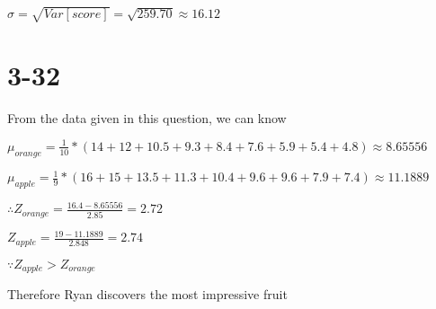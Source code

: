 \documentclass[12pt]{article}
\begin{document}
\begin{spacing}{2.0}
$\sigma=\sqrt{Var[score]}= \sqrt{259.70} \approx 16.12$

\section*{3-32}
From the data given in this question, we can know

$\mu_{orange}=\frac{1}{10}*(14+12+10.5+9.3+8.4+7.6+5.9+5.4+4.8) \approx 8.65556$

$\mu_{apple}=\frac{1}{9}*(16+15+13.5+11.3+10.4+9.6+9.6+7.9+7.4) \approx 11.1889$

$\therefore Z_{orange}=\frac{16.4-8.65556}{2.85}= 2.72$

$Z_{apple}= \frac{19-11.1889}{2.848}=2.74$

$\because Z_{apple}>Z_{orange}$

Therefore Ryan discovers the most impressive fruit

\end{spacing}
\end{document}
